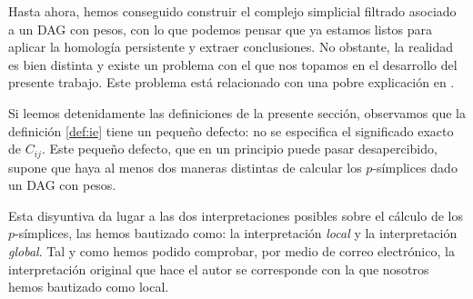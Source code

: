 \documentclass[12pt, a4paper, twoside]{book}
\numberwithin{equation}{section}
\theoremstyle{definition}
\theoremstyle{remark}
\theoremstyle{plain}
\begin{document}
	Hasta ahora, hemos conseguido construir el complejo simplicial 
	filtrado asociado a un DAG con pesos, con lo que podemos pensar que ya 
	estamos listos para aplicar la homología persistente y extraer 
	conclusiones. No obstante, la realidad es bien distinta y existe un 
	problema con el que nos topamos en el desarrollo del presente trabajo. 
	Este problema está relacionado con una pobre explicación en 
	\cite{Articulo-Watanabe}. 
	
	Si leemos detenidamente las definiciones de la presente sección, 
	observamos que la definición \ref{def:ie} tiene un pequeño defecto: no 
	se especifica el significado exacto de $C_{ij}$. Este pequeño defecto, 
	que en un principio puede pasar desapercibido, supone que haya al 
	menos dos maneras distintas de calcular los $p$-símplices dado un DAG 
	con pesos.

	Esta disyuntiva da lugar a las dos interpretaciones posibles sobre el
	cálculo de los $p$-símplices, las hemos bautizado como: la 
	interpretación \emph{local} y la interpretación \emph{global}. Tal y 
	como hemos podido comprobar, por medio de correo electrónico, la 
	interpretación original que hace el autor se corresponde con la que 
	nosotros hemos bautizado como local.
	
\end{document}
